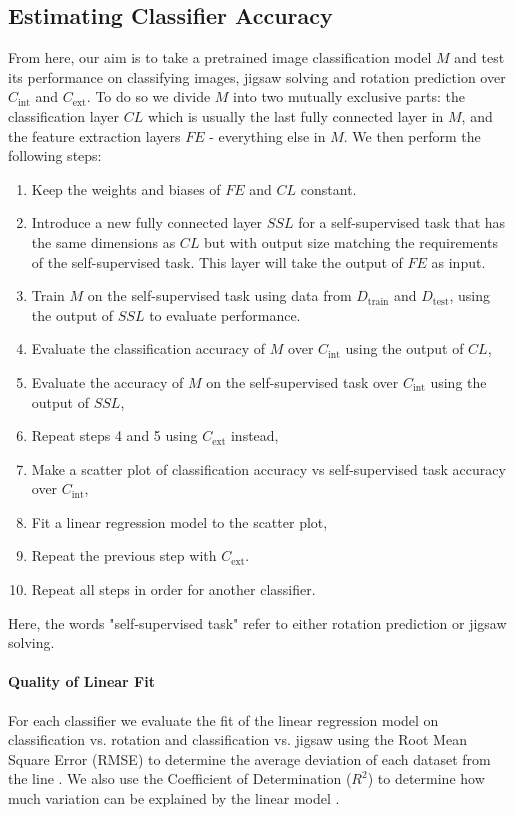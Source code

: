 \documentclass{article}
\begin{document}
\subsection{Estimating Classifier Accuracy}
From here, our aim is to take a pretrained image classification model $M$ and test its performance on classifying images, jigsaw solving and rotation prediction over $C_\text{int}$ and $C_\text{ext}$. To do so we divide $M$ into two mutually exclusive parts: the classification layer $CL$ which is usually the last fully connected layer in $M$, and the feature extraction layers $FE$ - everything else in $M$. We then perform the following steps:
\begin{enumerate}
  \item Keep the weights and biases of $FE$ and $CL$ constant.
  \item Introduce a new fully connected layer $SSL$ for a self-supervised task that has the same dimensions as $CL$ but with output size matching the requirements of the self-supervised task. This layer will take the output of $FE$ as input.
  \item Train $M$ on the self-supervised task using data from $D_\text{train}$ and $D_\text{test}$, using the output of $SSL$ to evaluate performance.
  \item Evaluate the classification accuracy of $M$ over $C_\text{int}$ using the output of $CL$,
  \item Evaluate the accuracy of $M$ on the self-supervised task over $C_\text{int}$ using the output of $SSL$,
  \item Repeat steps 4 and 5 using $C_\text{ext}$ instead,
  \item Make a scatter plot of classification accuracy vs self-supervised task accuracy over $C_\text{int}$,
  \item Fit a linear regression model to the scatter plot,
  \item Repeat the previous step with $C_\text{ext}$.
  \item Repeat all steps in order for another classifier.
\end{enumerate}
Here, the words "self-supervised task" refer to either rotation prediction or jigsaw solving.
\paragraph{Quality of Linear Fit} For each classifier we evaluate the fit of the linear regression model on classification vs. rotation and classification vs. jigsaw using the Root Mean Square Error (RMSE) to determine the average deviation of each dataset from the line \cite{chai2014root}. We also use the Coefficient of Determination ($R^2$) to determine how much variation can be explained by the linear model \cite{nagelkerke1991note}.
\end{document}
